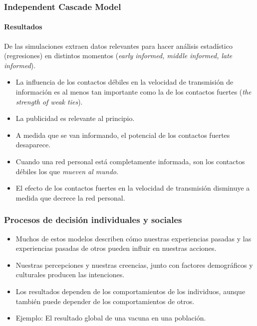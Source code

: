 \documentclass[11pt]{beamer}
\begin{document}
\begin{frame}
	\frametitle{Independent Cascade Model}
	\framesubtitle{Resultados}
	De las simulaciones extraen datos relevantes para hacer análisis estadístico (regresiones) en distintos momentos (\textit{early informed, middle informed, late informed}).
	\begin{itemize}
		\item La influencia de los contactos débiles en la velocidad de transmisión de información es al menos tan importante como la de los contactos fuertes (\textit{the strength of weak ties}).
		\item La publicidad es relevante al principio.
		\item A medida que se van informando, el potencial de los contactos fuertes desaparece.
		\item Cuando una red personal está completamente informada, son los contactos débiles los que \textit{mueven al mundo}.
		\item El efecto de los contactos fuertes en la velocidad de transmisión disminuye a medida que decrece la red personal.
	\end{itemize}
\end{frame}

\begin{frame}
	\frametitle{Procesos de decisión individuales y sociales}
	\begin{itemize}
		\item Muchos de estos modelos describen cómo nuestras experiencias pasadas y las experiencias pasadas de otros pueden influir en nuestras acciones.
		\item Nuestras percepciones y nuestras creencias, junto con factores demográficos y culturales producen las intenciones.
		\item Los resultados dependen de los comportamientos de los individuos, aunque también puede depender de los comportamientos de otros. 
		\item Ejemplo: El resultado global de una vacuna en una población.
	\end{itemize}
\end{frame}

%	
\end{document}
